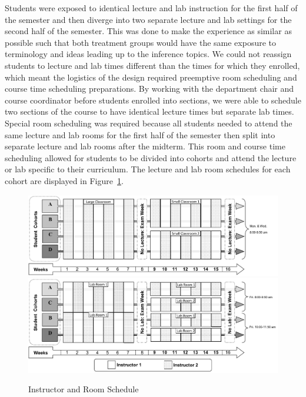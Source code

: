 \documentclass[11pt]{isuthesis}\usepackage[]{graphicx}\usepackage[]{color}
\begin{document}
Students were exposed to identical lecture and lab instruction for the first half of the semester and then diverge into two separate lecture and lab settings for the second half of the semester. This was done to make the experience as similar as possible such that both treatment groups would have the same exposure to terminology and ideas leading up to the inference topics. We could not reassign students to lecture and lab times different than the times for which they enrolled, which meant the logistics of the design required preemptive room scheduling and course time scheduling preparations.  By working with the department chair and course coordinator before students enrolled into sections, we were able to schedule two sections of the course to have identical lecture times but separate lab times. Special room scheduling was required because all students needed to attend the same lecture and lab rooms for the first half of the semester then split into separate lecture and lab rooms after the midterm.  This room and course time scheduling allowed for students to be divided into cohorts and attend the lecture or lab specific to their curriculum.  The lecture and lab room schedules for each cohort are displayed in Figure~\ref{fig:InstSched}.

\begin{figure}[hbtp]
\centering
\includegraphics[keepaspectratio=true, width=1\textwidth]{CurriculumStudy/LectureInstructionWithRooms.pdf}\\
\vspace{.5cm}
\includegraphics[keepaspectratio=true, width=1\textwidth]{CurriculumStudy/LabInstructionWithRooms.pdf}
\caption{\label{fig:InstSched} Instructor and Room Schedule}
\end{figure}
\end{document}
